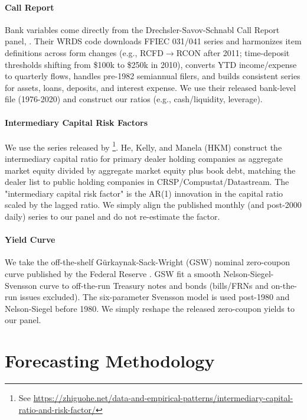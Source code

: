\documentclass{article}
\begin{document}
\paragraph{Call Report}
Bank variables come directly from the Drechsler-Savov-Schnabl Call Report panel, \citep{Drechsler2017}. Their WRDS code downloads FFIEC 031/041 series and harmonizes item definitions across form changes (e.g., RCFD$\rightarrow$RCON after 2011; time-deposit thresholds shifting from \$100k to \$250k in 2010), converts YTD income/expense to quarterly flows, handles pre-1982 semiannual filers, and builds consistent series for assets, loans, deposits, and interest expense. We use their released bank-level file (1976-2020) and construct our ratios (e.g., cash/liquidity, leverage). 

\paragraph{Intermediary Capital Risk Factors}
We use the series released by \citet{He2017}\footnote{See \url{https://zhiguohe.net/data-and-empirical-patterns/intermediary-capital-ratio-and-risk-factor/}}. He, Kelly, and Manela (HKM) construct the intermediary capital ratio for primary dealer holding companies as aggregate market equity divided by aggregate market equity plus book debt, matching the dealer list to public holding companies in CRSP/Compustat/Datastream. The "intermediary capital risk factor" is the AR(1) innovation in the capital ratio scaled by the lagged ratio. We simply align the published monthly (and post-2000 daily) series to our panel and do not re-estimate the factor.


\paragraph{Yield Curve}
We take the off-the-shelf Gürkaynak-Sack-Wright (GSW) nominal zero-coupon curve published by the Federal Reserve \citep{Gurkaynak2007}. GSW fit a smooth Nelson-Siegel-Svensson curve to off-the-run Treasury notes and bonds (bills/FRNs and on-the-run issues excluded). The six-parameter Svensson model is used post-1980 and Nelson-Siegel before 1980. We simply reshape the released zero-coupon yields to our panel. 


\section{Forecasting Methodology}
\label{sec:methodology}
\end{document}
